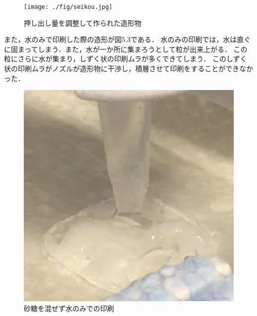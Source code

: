   \begin{figure}[H]
    \centering
    \texttt{[image: ./fig/seikou.jpg]}
    \caption{押し出し量を調整して作られた造形物}
    \label{fig:printer2}
  \end{figure}

また，水のみで印刷した際の造形が図5.3である．
水のみの印刷では，水は直ぐに固まってしまう．また，水が一か所に集まろうとして粒が出来上がる．
この粒にさらに水が集まり，しずく状の印刷ムラが多くできてしまう．
このしずく状の印刷ムラがノズルが造形物に干渉し，積層させて印刷をすることができなかった．

\begin{figure}[H]
    \centering
    \includegraphics[width=9truecm]{./fig/mizu.png}
    \caption{砂糖を混ぜず水のみでの印刷}
    \label{fig:printer2}
  \end{figure}




